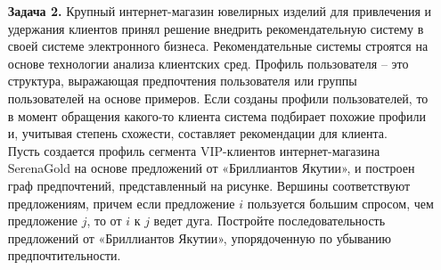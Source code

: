 \documentclass{article}
\begin{document}
\clearpage%
\begin{enumerate} 
\item[\textbf{Задача 2.}] Крупный интернет-магазин ювелирных изделий для привлечения и удержания клиентов принял решение внедрить рекомендательную систему в своей системе электронного бизнеса. Рекомендательные системы строятся на основе технологии анализа клиентских сред. Профиль пользователя – это структура, выражающая предпочтения пользователя или группы пользователей на основе примеров. Если созданы профили пользователей, то в момент обращения какого-то клиента система подбирает похожие профили и, учитывая степень схожести, составляет рекомендации для клиента.\\
Пусть создается профиль сегмента VIP-клиентов интернет-магазина SerenaGold на основе предложений от «Бриллиантов Якутии», и построен граф предпочтений, представленный на рисунке. Вершины соответствуют предложениям, причем если предложение $i$ пользуется большим спросом, чем предложение $j$, то от $i$ к $j$ ведет дуга. Постройте последовательность предложений от «Бриллиантов Якутии», упорядоченную по убыванию
предпочтительности. \\


\end{enumerate}
\end{document}
